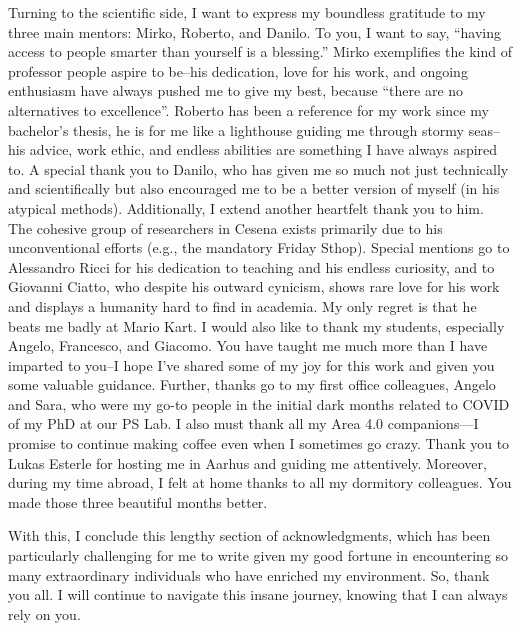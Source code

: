 Turning to the scientific side, 
 I want to express my boundless gratitude to my three main mentors: Mirko, Roberto, and Danilo. 
 To you, I want to say, ``having access to people smarter than yourself is a blessing.'' 
% 
Mirko exemplifies the kind of professor people aspire to be--his dedication, love for his work, 
 and ongoing enthusiasm have always pushed me to give my best, because ``there are no alternatives to excellence''. 
 Roberto has been a reference for my work since my bachelor's thesis, 
 he is for me like a lighthouse guiding me through stormy seas--his advice, work ethic, and endless abilities are something I have always aspired to. 
 A special thank you to Danilo, 
 who has given me so much not just technically and scientifically 
 but also encouraged me to be a better version of myself (in his atypical methods).
 Additionally, I extend another heartfelt thank you to him. The cohesive group of researchers in Cesena exists primarily due to his unconventional efforts (e.g., the mandatory Friday Sthop).
%
Special mentions go to Alessandro Ricci for his dedication to teaching and his endless curiosity, 
 and to Giovanni Ciatto, who despite his outward cynicism, shows rare love for his work and displays a humanity hard to find in academia. 
 My only regret is that he beats me badly at Mario Kart.
%
I would also like to thank my students, especially Angelo, Francesco, and Giacomo. 
 You have taught me much more than I have imparted to you--I hope I've shared some of my joy for this work and given you some valuable guidance.
%
Further, thanks go to my first office colleagues, Angelo and Sara, who were my go-to people in the initial dark months related to COVID of my PhD at our PS Lab.
%
I also must thank all my Area 4.0 companions—I promise to continue making coffee even when I sometimes go crazy.
%
Thank you to Lukas Esterle for hosting me in Aarhus and guiding me attentively. 
Moreover, during my time abroad, I felt at home thanks to all my dormitory colleagues. 
You made those three beautiful months better.

With this, 
 I conclude this lengthy section of acknowledgments, 
 which has been particularly challenging for me to write given my good fortune in encountering so many extraordinary individuals who have enriched my environment. So, thank you all. 
 I will continue to navigate this insane journey, knowing that I can always rely on you.